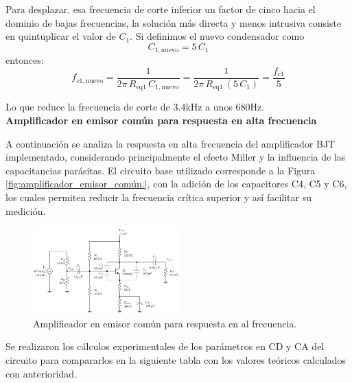 \documentclass[journal]{IEEEtran}
\begin{document}
\par Para desplazar, esa frecuencia de corte inferior un factor de cinco hacia el dominio de bajas frecuencias, la solución más directa y menos intrusiva consiste en quintuplicar el valor de \(C_1\). Si definimos el nuevo condensador como \[C_{1,\mathrm{nuevo}} = 5\,C_1\] entonces: 
\begin{equation}
f_{c1,\mathrm{nuevo}}
= \frac{1}{2\pi\,R_{\mathrm{eq1}}\,C_{1,\mathrm{nuevo}}}
= \frac{1}{2\pi\,R_{\mathrm{eq1}}\,(5\,C_1)}
= \frac{f_{c1}}{5}
\end{equation}
\par Lo que reduce la frecuencia de corte de 3.4kHz a unos 680Hz. 
\newline
\\
\textbf{Amplificador en emisor común para respuesta en alta frecuencia}
\par A continuación se analiza la respuesta en alta frecuencia del amplificador BJT implementado, considerando principalmente el efecto Miller y la influencia de las capacitancias parásitas. El circuito base utilizado corresponde a la Figura \ref{fig:amplificador_emisor_común.}, con la adición de los capacitores C4, C5 y C6, los cuales permiten reducir la frecuencia crítica superior y así facilitar su medición.
\begin{figure}[H]
    \centering
    \includegraphics[width=0.5\textwidth]{amplificador2.png}
    \caption{Amplificador en emisor común para respuesta en al frecuencia.}
    \label{fig:amplificador2}
\end{figure}
\par Se realizaron los cálculos experimentales de los parámetros en CD y CA del circuito para compararlos en la siguiente tabla con los valores teóricos calculados con anterioridad.
\end{document}
